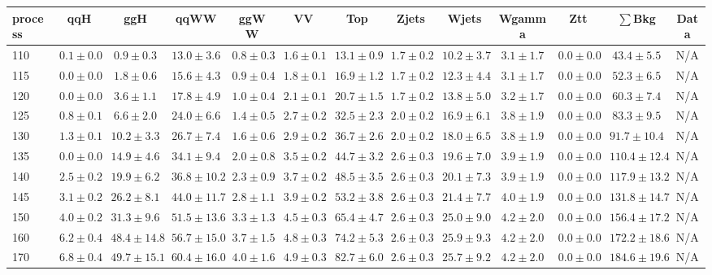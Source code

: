 \begin{table}
{%
 \tiny
 \begin{center}
 \begin{tabular}{l | c c | c c c c c c c c  | c c}
 \hline
 process & qqH & ggH & qqWW & ggWW & VV & Top & Zjets & Wjets & Wgamma & Ztt & $\sum$Bkg & Data \\
 \hline
110 & $0.1\pm0.0$ & $0.9\pm0.3$ & $13.0\pm3.6$ & $0.8\pm0.3$ & $1.6\pm0.1$ & $13.1\pm0.9$ & $1.7\pm0.2$ & $10.2\pm3.7$ & $3.1\pm1.7$ & $0.0\pm0.0$ & $43.4\pm5.5$ & N/A \\
115 & $0.0\pm0.0$ & $1.8\pm0.6$ & $15.6\pm4.3$ & $0.9\pm0.4$ & $1.8\pm0.1$ & $16.9\pm1.2$ & $1.7\pm0.2$ & $12.3\pm4.4$ & $3.1\pm1.7$ & $0.0\pm0.0$ & $52.3\pm6.5$ & N/A \\
120 & $0.0\pm0.0$ & $3.6\pm1.1$ & $17.8\pm4.9$ & $1.0\pm0.4$ & $2.1\pm0.1$ & $20.7\pm1.5$ & $1.7\pm0.2$ & $13.8\pm5.0$ & $3.2\pm1.7$ & $0.0\pm0.0$ & $60.3\pm7.4$ & N/A \\
125 & $0.8\pm0.1$ & $6.6\pm2.0$ & $24.0\pm6.6$ & $1.4\pm0.5$ & $2.7\pm0.2$ & $32.5\pm2.3$ & $2.0\pm0.2$ & $16.9\pm6.1$ & $3.8\pm1.9$ & $0.0\pm0.0$ & $83.3\pm9.5$ & N/A \\
130 & $1.3\pm0.1$ & $10.2\pm3.3$ & $26.7\pm7.4$ & $1.6\pm0.6$ & $2.9\pm0.2$ & $36.7\pm2.6$ & $2.0\pm0.2$ & $18.0\pm6.5$ & $3.8\pm1.9$ & $0.0\pm0.0$ & $91.7\pm10.4$ & N/A \\
135 & $0.0\pm0.0$ & $14.9\pm4.6$ & $34.1\pm9.4$ & $2.0\pm0.8$ & $3.5\pm0.2$ & $44.7\pm3.2$ & $2.6\pm0.3$ & $19.6\pm7.0$ & $3.9\pm1.9$ & $0.0\pm0.0$ & $110.4\pm12.4$ & N/A \\
140 & $2.5\pm0.2$ & $19.9\pm6.2$ & $36.8\pm10.2$ & $2.3\pm0.9$ & $3.7\pm0.2$ & $48.5\pm3.5$ & $2.6\pm0.3$ & $20.1\pm7.3$ & $3.9\pm1.9$ & $0.0\pm0.0$ & $117.9\pm13.2$ & N/A \\
145 & $3.1\pm0.2$ & $26.2\pm8.1$ & $44.0\pm11.7$ & $2.8\pm1.1$ & $3.9\pm0.2$ & $53.2\pm3.8$ & $2.6\pm0.3$ & $21.4\pm7.7$ & $4.0\pm1.9$ & $0.0\pm0.0$ & $131.8\pm14.7$ & N/A \\
150 & $4.0\pm0.2$ & $31.3\pm9.6$ & $51.5\pm13.6$ & $3.3\pm1.3$ & $4.5\pm0.3$ & $65.4\pm4.7$ & $2.6\pm0.3$ & $25.0\pm9.0$ & $4.2\pm2.0$ & $0.0\pm0.0$ & $156.4\pm17.2$ & N/A \\
160 & $6.2\pm0.4$ & $48.4\pm14.8$ & $56.7\pm15.0$ & $3.7\pm1.5$ & $4.8\pm0.3$ & $74.2\pm5.3$ & $2.6\pm0.3$ & $25.9\pm9.3$ & $4.2\pm2.0$ & $0.0\pm0.0$ & $172.2\pm18.6$ & N/A \\
170 & $6.8\pm0.4$ & $49.7\pm15.1$ & $60.4\pm16.0$ & $4.0\pm1.6$ & $4.9\pm0.3$ & $82.7\pm6.0$ & $2.6\pm0.3$ & $25.7\pm9.2$ & $4.2\pm2.0$ & $0.0\pm0.0$ & $184.6\pm19.6$ & N/A \\

\end{tabular}
\end{center}}
\end{table}
